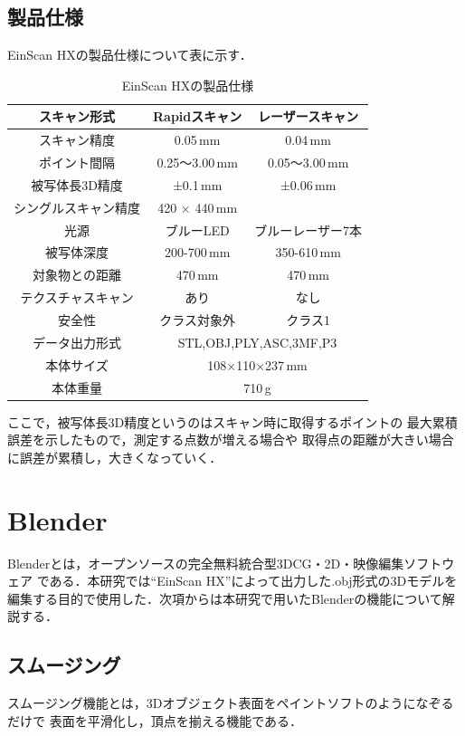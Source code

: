\documentclass{ltjsreport}
\begin{document}
		\subsection{製品仕様}
			EinScan HXの製品仕様について表に示す．
			\begin{table}[H]
			\begin{center}
			\caption{EinScan HXの製品仕様}
			\label{tab:EinScan}
			\begin{tabular}{c|cc} \toprule
				スキャン形式&Rapidスキャン&レーザースキャン\\ \hline
				スキャン精度&0.05\,mm&0.04\,mm\\
				ポイント間隔&0.25～3.00\,mm&0.05～3.00\,mm\\
				被写体長3D精度&±0.1\,mm&±0.06\,mm\\
				シングルスキャン精度&420 × 440\,mm&\\
				光源&ブルーLED&ブルーレーザー7本\\
				被写体深度&200-700\,mm&350-610\,mm\\
				対象物との距離&470\,mm&470\,mm\\
				テクスチャスキャン&あり&なし\\
				安全性&クラス対象外&クラス1\\ \hline
				データ出力形式&\multicolumn{2}{c}{STL,OBJ,PLY,ASC,3MF,P3}\\
				本体サイズ&\multicolumn{2}{c}{108×110×237\,mm}\\
				本体重量&\multicolumn{2}{c}{710\,g}\\
				\bottomrule
			\end{tabular}
			\end{center}
			\end{table}
			ここで，被写体長3D精度というのはスキャン時に取得するポイントの
			最大累積誤差を示したもので，測定する点数が増える場合や
			取得点の距離が大きい場合に誤差が累積し，大きくなっていく．

	\section{Blender}
	
		Blenderとは，オープンソースの完全無料統合型3DCG・2D・映像編集ソフトウェア
		である．本研究では``EinScan HX''によって出力した.obj形式の3Dモデルを
		編集する目的で使用した．次項からは本研究で用いたBlenderの機能について解説する．
		\subsection{スムージング}
			スムージング機能とは，3Dオブジェクト表面をペイントソフトのようになぞるだけで
			表面を平滑化し，頂点を揃える機能である．
\end{document}
